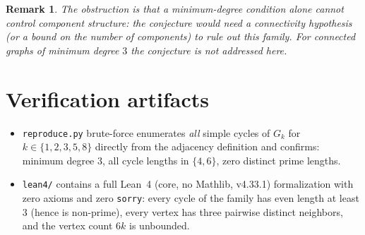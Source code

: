 \documentclass[11pt]{article}
\newtheorem{remark}[theorem]{Remark}
\begin{document}
\begin{remark}
The obstruction is that a minimum-degree condition alone cannot control
component structure: the conjecture would need a connectivity hypothesis (or a
bound on the number of components) to rule out this family. For connected
graphs of minimum degree $3$ the conjecture is not addressed here.
\end{remark}

\section{Verification artifacts}

\begin{itemize}
  \item \texttt{reproduce.py} brute-force enumerates \emph{all} simple cycles
        of $G_k$ for $k \in \{1,2,3,5,8\}$ directly from the adjacency
        definition and confirms: minimum degree $3$, all cycle lengths in
        $\{4,6\}$, zero distinct prime lengths.
  \item \texttt{lean4/} contains a full Lean~4 (core, no Mathlib,
        v4.33.1) formalization with zero axioms and zero \texttt{sorry}:
        every cycle of the family has even length at least $3$ (hence is
        non-prime), every vertex has three pairwise distinct neighbors, and
        the vertex count $6k$ is unbounded.
\end{itemize}
\end{document}
